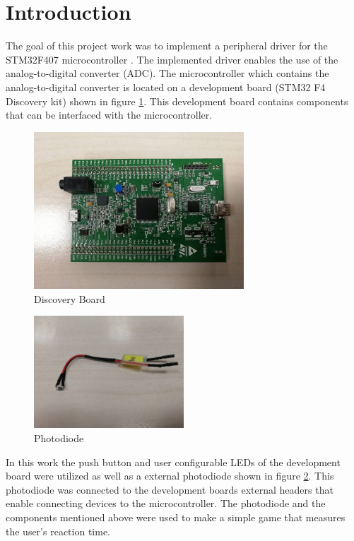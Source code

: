 \section{Introduction}
The goal of this project work was to implement a peripheral driver for the STM32F407 microcontroller \cite{RefManual}. The implemented driver enables the use of the analog-to-digital converter (ADC). The microcontroller which contains the analog-to-digital converter is located on a development board (STM32 F4 Discovery kit) shown in figure \ref{fig:Board}. This development board contains components that can be interfaced with the microcontroller.\\

\begin{figure}[htbp]
  \centering
     \includegraphics[width=0.7\textwidth]{./figures/board.jpg}
  \caption{Discovery Board}
  \label{fig:Board}
\end{figure}

\begin{figure}[htbp]
  \centering
     \includegraphics[width=0.5\textwidth]{./figures/photodiode.jpg}
  \caption{Photodiode}
  \label{fig:photodiode}
\end{figure}

\par
In this work the push button and user configurable LEDs of the development board were utilized as well as a external photodiode shown in figure \ref{fig:photodiode}. This photodiode was connected to the development boards external headers that enable connecting devices to the microcontroller. The photodiode and the components mentioned above were used to make a simple game that measures the user's reaction time.


